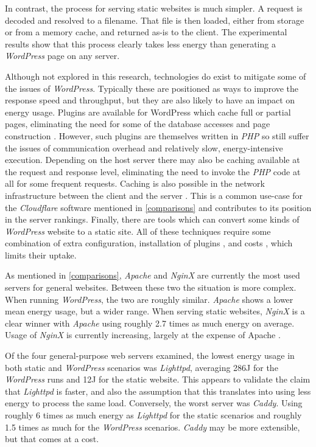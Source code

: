 In contrast, the process for serving static websites is much simpler. A request is decoded and resolved to a filename. That file is then loaded, either from storage or from a memory cache, and returned as-is to the client. The experimental results show that this process clearly takes less energy than generating a \emph{WordPress} page on any server.

Although not explored in this research, technologies do exist to mitigate some of the issues of \emph{WordPress}. Typically these are positioned as ways to improve the response speed and throughput, but they are also likely to have an impact on energy usage. Plugins are available for WordPress which cache full or partial pages, eliminating the need for some of the database accesses and page construction \citep{BoldGrid2022}. However, such plugins are themselves written in \emph{PHP} so still suffer the issues of communication overhead and relatively slow, energy-intensive execution. Depending on the host server there may also be caching available at the request and response level, eliminating the need to invoke the \emph{PHP} code at all for some frequent requests. Caching is also possible in the network infrastructure between the client and the server \citep{Kusuma2017}. This is a common use-case for the \emph{Cloudflare} software mentioned in \autoref{comparisons} and contributes to its position in the server rankings. Finally, there are tools which can convert some kinds of \emph{WordPress} website to a static site. All of these techniques require some combination of extra configuration, installation of plugins \citep{Data2017}, and costs \citep{Strattic}, which limits their uptake. 

As mentioned in \autoref{comparisons}, \emph{Apache} and \emph{NginX} are currently the most used servers for general websites. Between these two the situation is more complex. When running \emph{WordPress}, the two are roughly similar. \emph{Apache} shows a lower mean energy usage, but a wider range. When serving static websites, \emph{NginX} is a clear winner with \emph{Apache} using roughly 2.7 times as much energy on average. Usage of \emph{NginX} is currently increasing, largely at the expense of Apache \citep{Netcraft2023}.

Of the four general-purpose web servers examined, the lowest energy usage in both static and \emph{WordPress} scenarios was \emph{Lighttpd}, averaging 286J for the \emph{WordPress} runs and 12J for the static website. This appears to validate the claim that \emph{Lighttpd} is faster, and also the assumption that this translates into using less energy to process the same load. Conversely, the worst server was \emph{Caddy}. Using roughly 6 times as much energy as \emph{Lighttpd} for the static scenarios and roughly 1.5 times as much for the \emph{WordPress} scenarios. \emph{Caddy} may be more extensible, but that comes at a cost.

